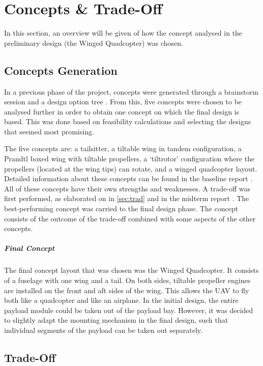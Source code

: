 \chapter{Concepts \& Trade-Off}
\setlength{\parindent}{15pt}
\label{ch:conc_trad}
In this section, an overview will be given of how the concept analysed in the preliminary design (the Winged Quadcopter) was chosen.


\section{Concepts Generation}
\label{sec:conc_gene}
In a previous phase of the project, concepts were generated through a brainstorm session and a design option tree \cite{projplan}. From this, five concepts were chosen to be analysed further in order to obtain one concept on which the final design is based. This was done based on feasibility calculations and selecting the designs that seemed most promising. 


The five concepts are: a tailsitter, a tiltable wing in tandem configuration, a Prandtl boxed wing with tiltable propellers, a `tiltrotor' configuration where the propellers (located at the wing tips) can rotate, and a winged quadcopter layout. Detailed information about these concepts can be found in the baseline report \cite{baseline}. All of these concepts have their own strengths and weaknesses. A trade-off was first performed, as elaborated on in \autoref{sec:trad} and in the midterm report \cite{midterm}. The best-performing concept was carried to the final design phase. The concept consists of the outcome of the trade-off combined with some aspects of the other concepts.

\paragraph{Final Concept}
The final concept layout that was chosen was the Winged Quadcopter. It consists of a fuselage with one wing and a tail. On both sides, tiltable propeller engines are installed on the front and aft sides of the wing. This allows the UAV to fly both like a quadcopter and like an airplane. In the initial design, the entire payload module could be taken out of the payload bay. However, it was decided to slightly adapt the mounting mechanism in the final design, such that individual segments of the payload can be taken out separately.


\section{Trade-Off}
\label{sec:trad}


